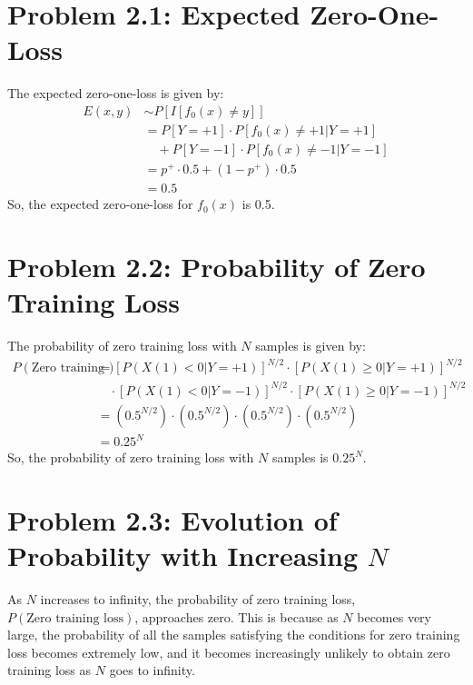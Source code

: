 \documentclass{article}
\begin{document}
\section*{Problem 2.1: Expected Zero-One-Loss}
The expected zero-one-loss is given by:
\begin{align*}
E(x, y) & \sim P[I[f_0(x) \neq y]] \\
& = P[Y = +1] \cdot P[f_0(x) \neq +1 | Y = +1] \\
& \quad + P[Y = -1] \cdot P[f_0(x) \neq -1 | Y = -1] \\
& = p^+ \cdot 0.5 + (1 - p^+) \cdot 0.5 \\
& = 0.5
\end{align*}
So, the expected zero-one-loss for $f_0(x)$ is 0.5.

\section*{Problem 2.2: Probability of Zero Training Loss}
The probability of zero training loss with $N$ samples is given by:
\begin{align*}
P(\text{Zero training loss}) & = \left[P(X(1) < 0 | Y = +1)\right]^{N/2} \cdot \left[P(X(1) \geq 0 | Y = +1)\right]^{N/2} \\
& \quad \cdot \left[P(X(1) < 0 | Y = -1)\right]^{N/2} \cdot \left[P(X(1) \geq 0 | Y = -1)\right]^{N/2} \\
& = (0.5^{N/2}) \cdot (0.5^{N/2}) \cdot (0.5^{N/2}) \cdot (0.5^{N/2}) \\
& = 0.25^N
\end{align*}
So, the probability of zero training loss with $N$ samples is $0.25^N$.

\section*{Problem 2.3: Evolution of Probability with Increasing $N$}
As $N$ increases to infinity, the probability of zero training loss, $P(\text{Zero training loss})$, approaches zero. This is because as $N$ becomes very large, the probability of all the samples satisfying the conditions for zero training loss becomes extremely low, and it becomes increasingly unlikely to obtain zero training loss as $N$ goes to infinity.
\end{document}
